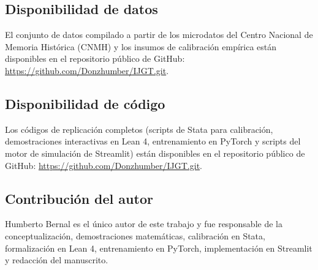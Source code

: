 \documentclass[pdflatex,sn-mathphys-ay]{sn-jnl}
\theoremstyle{thmstyleone}
\theoremstyle{thmstyletwo}
\theoremstyle{thmstylethree}
\newcommand{\1}{\mathbf{1}}
\begin{document}
\subsection*{Disponibilidad de datos}
El conjunto de datos compilado a partir de los microdatos del Centro Nacional de Memoria Histórica (CNMH) y los insumos de calibración empírica están disponibles en el repositorio público de GitHub: \url{https://github.com/Donzhumber/IJGT.git}.

\subsection*{Disponibilidad de código}
Los códigos de replicación completos (scripts de Stata para calibración, demostraciones interactivas en Lean 4, entrenamiento en PyTorch y scripts del motor de simulación de Streamlit) están disponibles en el repositorio público de GitHub: \url{https://github.com/Donzhumber/IJGT.git}.

\subsection*{Contribución del autor}
Humberto Bernal es el único autor de este trabajo y fue responsable de la conceptualización, demostraciones matemáticas, calibración en Stata, formalización en Lean 4, entrenamiento en PyTorch, implementación en Streamlit y redacción del manuscrito.


\end{document}
